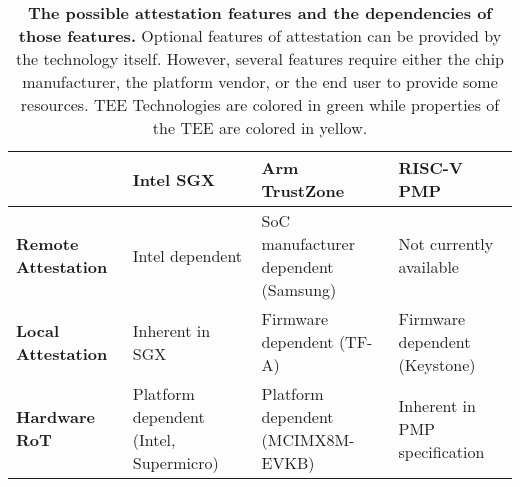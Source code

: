\begin{table*}[p]
\begin{center}
\begin{tabular}{|L{3cm}|L{3.25cm}|L{3.25cm}|L{3.25cm}|}
\hline
\textbf{}  & \textbf{Intel SGX} & \textbf{Arm TrustZone} & \textbf{RISC-V PMP} \\ \hline
{}\textbf{Remote Attestation} & Intel dependent      & SoC manufacturer dependent (Samsung)     & Not currently available     \\ \hline
{}\textbf{Local Attestation}  & Inherent in SGX      & Firmware dependent (TF-A)      & Firmware dependent (Keystone)    \\ \hline
{}\textbf{Hardware RoT}       & Platform dependent (Intel, Supermicro)       & Platform dependent  (MCIMX8M-EVKB)     & Inherent in PMP specification   \\ \hline
\end{tabular}
\end{center}
\caption[Attestation Comparison]{\textbf{The possible attestation features and the dependencies of those features.} Optional features of attestation can be provided by the technology itself. However, several features require either the chip manufacturer, the platform vendor, or the end user to provide some resources. TEE Technologies are colored in \colorbox{tbl-gre}{green} while properties of the TEE are colored in \colorbox{tbl-yel}{yellow}.}
\label{tab:attest-compare}
\end{table*}

